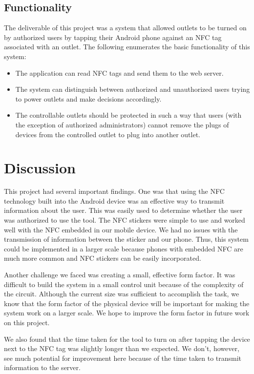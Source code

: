 \documentclass{sigchi}
\begin{document}
\subsection {Functionality}
The deliverable of this project was a system that allowed outlets to be turned on by authorized users by tapping their Android phone against an NFC tag associated with an outlet. The following enumerates the basic functionality of this system:
\begin{itemize}
\item The application can read NFC tags and send them to the web server.

\item The system can distinguish between authorized and unauthorized users trying to power outlets and make decisions accordingly. 

\item The controllable outlets should be protected in such a way that users (with the exception of authorized administrators) cannot remove the plugs of devices from the controlled outlet to plug into another outlet.
\end{itemize}
\section{Discussion}

This project had several important findings. One was that using the NFC technology built into the Android device was an effective way to transmit information about the user. This was easily used to determine whether the user was authorized to use the tool. The NFC stickers were simple to use and worked well with the NFC embedded in our mobile device. We had no issues with the transmission of information between the sticker and our phone. Thus, this system could be implemented in a larger scale because phones with embedded NFC are much more common and NFC stickers can be easily incorporated.

Another challenge we faced was creating a small, effective form factor. It was difficult to build the system in a small control unit because of the complexity of the circuit. Although the current size was sufficient to accomplish the task, we know that the form factor of the physical device will be important for making the system work on a larger scale. We hope to improve the form factor in future work on this project.

We also found that the time taken for the tool to turn on after tapping the device next to the NFC tag was slightly longer than we expected. We don't, however, see much potential for improvement here because of the time taken to transmit information to the server.
\end{document}
